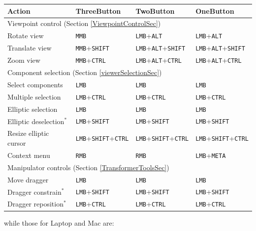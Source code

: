 \documentclass{article}
\begin{document}
\begin{center}
\begin{tabular}{|l|l|l|l|}
\hline
Action & {\sf ThreeButton} & {\sf TwoButton} & {\sf OneButton}\\
\hline
\hline
\multicolumn{4}{|l|}{Viewpoint control (Section \ref{ViewpointControlSec})}\\
\hline
Rotate view & 
{\tt MMB} & {\tt LMB}+{\tt ALT} & {\tt LMB}+{\tt ALT}\\
Translate view & 
{\tt MMB}+{\tt SHIFT} & {\tt LMB}+{\tt ALT}+{\tt SHIFT} & 
{\tt LMB}+{\tt ALT}+{\tt SHIFT}\\
Zoom view & 
{\tt MMB}+{\tt CTRL} & {\tt LMB}+{\tt ALT}+{\tt CTRL} & 
{\tt LMB}+{\tt ALT}+{\tt CTRL}\\
\hline
\multicolumn{4}{|l|}{Component selection (Section \ref{viewerSelectionSec})}\\
\hline
Select components & 
{\tt LMB} & {\tt LMB} & {\tt LMB}\\
Multiple selection & 
{\tt LMB}+{\tt CTRL} & {\tt LMB}+{\tt CTRL} & {\tt LMB}+{\tt CTRL}\\
Elliptic selection & 
{\tt LMB} & {\tt LMB} & {\tt LMB}\\
Elliptic deselection$^*$ & 
{\tt LMB}+{\tt SHIFT} & {\tt LMB}+{\tt SHIFT} & {\tt LMB}+{\tt SHIFT}\\
Resize elliptic cursor & 
{\tt LMB}+{\tt SHIFT}+{\tt CTRL} & {\tt LMB}+{\tt SHIFT}+{\tt CTRL} & 
{\tt LMB}+{\tt SHIFT}+{\tt CTRL}\\
Context menu & 
{\tt RMB} & {\tt RMB} & {\tt LMB}+{\tt META}\\
\hline
\multicolumn{4}{|l|}{Manipulator controls (Section \ref{TransformerToolsSec})}\\
\hline
Move dragger & 
{\tt LMB} & {\tt LMB} & {\tt LMB}\\
Dragger constrain$^*$ & 
{\tt LMB}+{\tt SHIFT} & {\tt LMB}+{\tt SHIFT} & {\tt LMB}+{\tt SHIFT}\\
Dragger reposition$^*$ & 
{\tt LMB}+{\tt CTRL} & {\tt LMB}+{\tt CTRL} & {\tt LMB}+{\tt CTRL}\\
\hline
\end{tabular}
\end{center}

while those for {\sf Laptop} and {\sf Mac} are:
\end{document}
